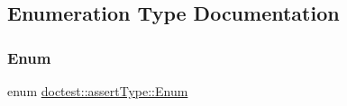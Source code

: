 \subsection{Enumeration Type Documentation}
\mbox{\label{namespacedoctest_1_1assert_type_ae1bb5bed722f34f1c38b83cb19d326d3}} 
\subsubsection{\texorpdfstring{Enum}{Enum}}
{\footnotesize\ttfamily enum \hyperlink{namespacedoctest_1_1assert_type_ae1bb5bed722f34f1c38b83cb19d326d3}{doctest\+::assert\+Type\+::\+Enum}}

